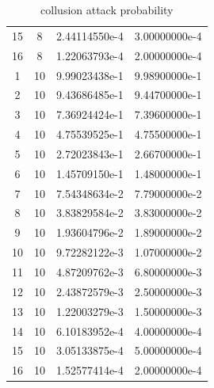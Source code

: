 \begin{table}[h]
\begin{tabular}{|c|c|c|c|}
15 & 8 & 2.44114550e-4 & 3.00000000e-4 \\
16 & 8 & 1.22063793e-4 & 2.00000000e-4 \\
1 & 10 & 9.99023438e-1 & 9.98900000e-1 \\
2 & 10 & 9.43686485e-1 & 9.44700000e-1 \\
3 & 10 & 7.36924424e-1 & 7.39600000e-1 \\
4 & 10 & 4.75539525e-1 & 4.75500000e-1 \\
5 & 10 & 2.72023843e-1 & 2.66700000e-1 \\
6 & 10 & 1.45709150e-1 & 1.48000000e-1 \\
7 & 10 & 7.54348634e-2 & 7.79000000e-2 \\
8 & 10 & 3.83829584e-2 & 3.83000000e-2 \\
9 & 10 & 1.93604796e-2 & 1.89000000e-2 \\
10 & 10 & 9.72282122e-3 & 1.07000000e-2 \\
11 & 10 & 4.87209762e-3 & 6.80000000e-3 \\
12 & 10 & 2.43872579e-3 & 2.50000000e-3 \\
13 & 10 & 1.22003279e-3 & 1.50000000e-3 \\
14 & 10 & 6.10183952e-4 & 4.00000000e-4 \\
15 & 10 & 3.05133875e-4 & 5.00000000e-4 \\
16 & 10 & 1.52577414e-4 & 2.00000000e-4 \\
\hline
\end{tabular}
\caption{collusion attack probability}
\label{tab:T02}
\end{table}
